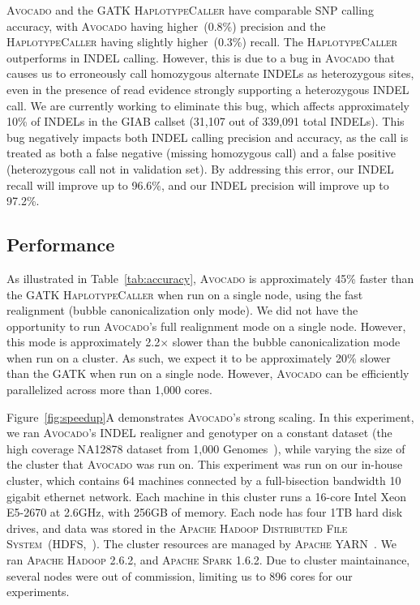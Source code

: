 \documentclass{bioinfo}
\begin{document}
\textsc{Avocado} and the \textsc{GATK HaplotypeCaller} have comparable SNP
calling accuracy, with \textsc{Avocado} having higher~(0.8\%) precision
and the \textsc{HaplotypeCaller} having slightly higher~(0.3\%) recall.
The \textsc{HaplotypeCaller} outperforms in INDEL calling. However, this
is due to a bug in \textsc{Avocado} that causes us to erroneously call
homozygous alternate INDELs as heterozygous sites, even in the presence
of read evidence strongly supporting a heterozygous INDEL call. We are
currently working to eliminate this bug, which affects approximately
10\% of INDELs in the GIAB callset (31,107 out of 339,091 total INDELs).
This bug negatively impacts both INDEL calling precision and accuracy, as
the call is treated as both a false negative (missing homozygous call) and a
false positive (heterozygous call not in validation set). By addressing this
error, our INDEL recall will improve up to 96.6\%, and our INDEL precision
will improve up to 97.2\%.

\subsection{Performance}
\label{sec:performance}

As illustrated in Table~\ref{tab:accuracy}, \textsc{Avocado} is approximately
45\% faster than the \textsc{GATK HaplotypeCaller} when run on a single node,
using the fast realignment (bubble canonicalization only mode). We did not
have the opportunity to run \textsc{Avocado}'s full realignment mode on a
single node. However, this mode is approximately 2.2$\times$ slower than
the bubble canonicalization mode when run on a cluster. As such, we expect
it to be approximately 20\% slower than the \textsc{GATK} when run on a single
node. However, \textsc{Avocado} can be efficiently parallelized across more
than 1,000 cores.

Figure~\ref{fig:speedup}A demonstrates \textsc{Avocado}'s strong scaling. In
this experiment, we ran \textsc{Avocado}'s INDEL realigner and genotyper on a
constant dataset (the high coverage NA12878 dataset from 1,000
Genomes~\citep{1kg}), while varying the size of the cluster that \textsc{Avocado}
was run on. This experiment was run on our in-house cluster, which contains
64 machines connected by a full-bisection bandwidth 10 gigabit ethernet
network. Each machine in this cluster runs a 16-core Intel Xeon E5-2670 at
2.6GHz, with 256GB of memory. Each node has four 1TB hard disk
drives, and data was stored in the \textsc{Apache Hadoop Distributed File
System}~(HDFS,~\citep{shvachko10}). The cluster resources are managed by \textsc{Apache
YARN}~\citep{vavilapalli13}. We ran \textsc{Apache Hadoop} 2.6.2, and \textsc{Apache
Spark} 1.6.2. Due to cluster maintainance, several nodes were out of commission,
limiting us to 896 cores for our experiments.
\end{document}
